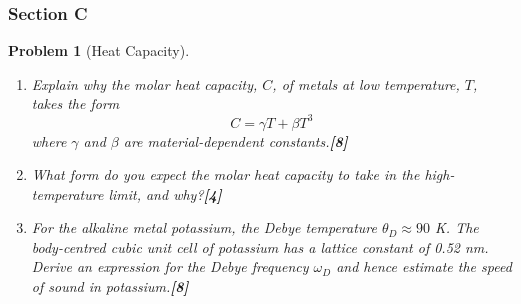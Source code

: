 \documentclass[a4paper]{article}
\theoremstyle{new}
\newtheorem{qns}{Problem}[subsection]
\begin{document}
\subsubsection{Section C}
\begin{qns}[Heat Capacity]\leavevmode
\begin{enumerate}[label=(\roman*)]
\item Explain why the molar heat capacity, $C$, of metals at low temperature, $T$, takes the form
$$C=\gamma T+\beta T^3$$
where $\gamma$ and $\beta$ are material-dependent constants.\hfill\textbf{[8]}
\item What form do you expect the molar heat capacity to take in the high-temperature limit, and why?\hfill\textbf{[4]}
\item For the alkaline metal potassium, the Debye temperature $\theta_D\approx 90$ K. The body-centred cubic unit cell of potassium has a lattice constant of 0.52 nm. Derive an expression for the Debye frequency $\omega_D$ and hence estimate the speed of sound in potassium.\hfill\textbf{[8]}
\end{enumerate}
\end{qns}
\end{document}
